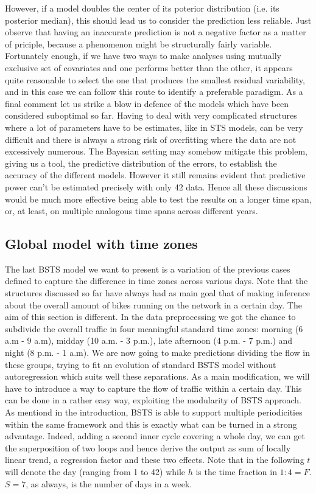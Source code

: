 \documentclass[11pt,twoside]{report}
\begin{document}
However, if a model doubles the center of its poterior distribution (i.e. its posterior median), this should lead us to consider the prediction less reliable. Just observe that having an inaccurate prediction is not a negative factor as a matter of priciple, because a phenomenon might be structurally fairly variable. Fortunately enough, if we have two ways to make analyses using mutually exclusive set of covariates and one performs better than the other, it appears quite reasonable to select the one that produces the smallest residual variability, and in this case we can follow this route to identify a preferable paradigm.
As a final comment let us strike a blow in defence of the models which have been considered suboptimal so far. Having to deal with very complicated structures where a lot of parameters have to be estimates, like in STS models, can be very difficult and there is always a strong risk of overfitting where the data are not excessively numerous. The Bayesian setting may somehow mitigate this problem, giving us a tool, the predictive distribution of the errors, to establish the accuracy of the different models. However it still remains evident that predictive power can't be estimated precisely with only 42 data. Hence all these discussions would be much more effective being able to test the results on a longer time span, or, at least, on multiple analogous time spans across different years.
 
 \subsection{Global model with time zones}
 The last BSTS model we want to present is a variation of the previous cases defined to capture the difference in time zones across various days. Note that the structures discussed so far have always had as main goal that of making inference about the overall amount of bikes running on the network in a certain day. The aim of this section is different. In the data preprocessing we got the chance to subdivide the overall traffic in four meaningful standard time zones: morning (6 a.m - 9 a.m), midday (10 a.m. - 3 p.m.), late afternoon (4 p.m. - 7 p.m.) and night (8 p.m. - 1 a.m). We are now going to make predictions dividing the flow in these groups, trying to fit an evolution of standard BSTS model without autoregression which suits well these separations.
 As a main modification, we will have to introduce a way to capture the flow of traffic within a certain day. This can be done in a rather easy way, exploiting the modularity of BSTS approach. As mentiond in the introduction, BSTS is able to support multiple periodicities within the same framework and this is exactly what can be turned in a strong advantage. Indeed, adding a second inner cycle covering a whole day, we can get the superposition of two loops and hence derive the output as sum of locally linear trend, a regression factor and these two effects. Note that in the following $ t $ will denote the day (ranging from 1 to 42) while $ h $ is the time fraction in $ 1:4=F $. $ S=7 $, as always, is the number of days in a week.
 
\end{document}
